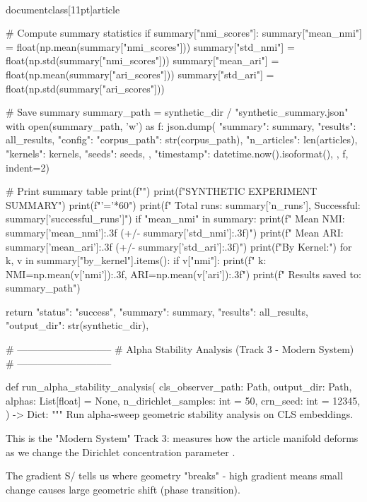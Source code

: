 \\documentclass[11pt]{article}
\begin{document}
\begin{CodeBlock}
    # Compute summary statistics
    if summary["nmi_scores"]:
        summary["mean_nmi"] = float(np.mean(summary["nmi_scores"]))
        summary["std_nmi"] = float(np.std(summary["nmi_scores"]))
        summary["mean_ari"] = float(np.mean(summary["ari_scores"]))
        summary["std_ari"] = float(np.std(summary["ari_scores"]))

    # Save summary
    summary_path = synthetic_dir / "synthetic_summary.json"
    with open(summary_path, 'w') as f:
        json.dump({
            "summary": summary,
            "results": all_results,
            "config": {
                "corpus_path": str(corpus_path),
                "n_articles": len(articles),
                "kernels": kernels,
                "seeds": seeds,
            },
            "timestamp": datetime.now().isoformat(),
        }, f, indent=2)

    # Print summary table
    print(f"")
    print(f"SYNTHETIC EXPERIMENT SUMMARY")
    print(f"{'='*60}")
    print(f"  Total runs: {summary['n_runs']}, Successful: {summary['successful_runs']}")
    if "mean_nmi" in summary:
        print(f"  Mean NMI: {summary['mean_nmi']:.3f} (+/- {summary['std_nmi']:.3f})")
        print(f"  Mean ARI: {summary['mean_ari']:.3f} (+/- {summary['std_ari']:.3f})")
        print(f"\n  By Kernel:")
        for k, v in summary["by_kernel"].items():
            if v["nmi"]:
                print(f"    {k}: NMI={np.mean(v['nmi']):.3f}, ARI={np.mean(v['ari']):.3f}")
    print(f"  Results saved to: {summary_path}")

    return {
        "status": "success",
        "summary": summary,
        "results": all_results,
        "output_dir": str(synthetic_dir),
    }


# -----------------------------
# Alpha Stability Analysis (Track 3 - Modern System)
# -----------------------------

def run_alpha_stability_analysis(
    cls_observer_path: Path,
    output_dir: Path,
    alphas: List[float] = None,
    n_dirichlet_samples: int = 50,
    crn_seed: int = 12345,
) -> Dict:
    """
    Run alpha-sweep geometric stability analysis on CLS embeddings.

    This is the "Modern System" Track 3: measures how the article manifold
    deforms as we change the Dirichlet concentration parameter .

    The gradient S/ tells us where geometry "breaks" - high gradient
    means small  change causes large geometric shift (phase transition).


\end{CodeBlock}
\end{document}
